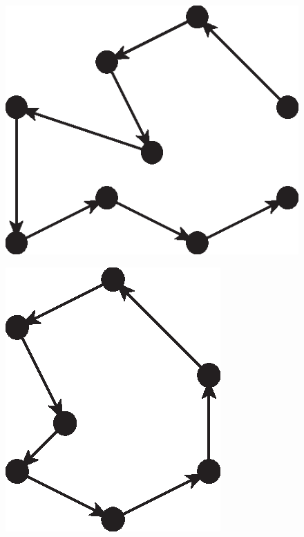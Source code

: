      \begin{figure}[H]
        \centering
        \begin{minipage}[b]{0.43\textwidth}
          \centering
          \includegraphics[width=\textwidth]{chapters/02_problem_definition/path}
          \label{fig:path}
        \end{minipage}
        \qquad\qquad
        \begin{minipage}[b]{0.3\textwidth}
          \centering
          \includegraphics[width=\textwidth]{chapters/02_problem_definition/cycle}
          \label{fig:cycle}
        \end{minipage}
      \end{figure}

